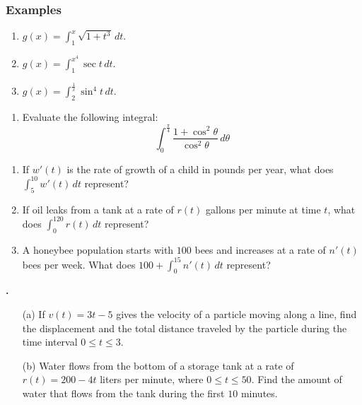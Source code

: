 \documentclass[t]{beamer}
\theoremstyle{plain}
\theoremstyle{definition}
\newcommand{\ds}{\displaystyle}
\newcounter{heading}
\newcommand{\newhead}[1]{\medskip\stepcounter{heading}\noindent\textbf{\hspace{0.2cm}{#1}.}}
\begin{document}
\begin{frame}
\frametitle{Examples}
\begin{enumerate}[<+->]
\item $g(x) = \ds\int_{1}^{x} \sqrt{1+t^3}\,dt.$
\vspace*{.2cm}
\item $g(x) = \ds\int_{1}^{x^{4}}\sec t \, dt.$
\vspace*{.2cm}
\item $g(x) = \ds\int_{2}^{\frac{1}{x}}\sin^{4}t \, dt.$
\vspace*{.2cm}
\end{enumerate}

\begin{enumerate}[<+->]
\addtocounter{enumi}{3}
\item Evaluate the following integral:$$\int_{0}^{\frac{\pi}{4}}\frac{1+\cos^{2}\theta}{\cos^{2}\theta}\,d\theta$$
\end{enumerate}
\end{frame}

\begin{frame}
\uncover<+->{\newhead{Examples}}
\begin{enumerate}[<+->]
\item If $w'(t)$ is the rate of growth of a child in pounds per year, what does $\int_{5}^{10}w'(t)\,dt$ represent?
\vspace*{.3cm}
\item If oil leaks from a tank at a rate of $r(t)$ gallons per minute at time $t$, what does $\int_{0}^{120}r(t)\,dt$ represent?
\vspace*{.2cm}
\item A honeybee population starts with $100$ bees and increases at a rate of $n'(t)$ bees per week.  What does $100 + \int_{0}^{15}n'(t)\,dt$ represent?
\end{enumerate}
\end{frame}

\begin{frame}
\newhead{Further Examples}
\begin{enumerate}[<+->]
\item[(a)] If $v(t) = 3t -5$ gives the velocity of a particle moving along a line, find the displacement and the total distance traveled by the particle during the time interval $0 \leq t \leq 3$.
\medskip
\item[(b)] Water flows from the bottom of a storage tank at a rate of $r(t) = 200 - 4t$ liters per minute, where $0\leq t \leq 50$.  Find the amount of water that flows from the tank during the first $10$ minutes.
\end{enumerate}
\end{frame}
\end{document}
